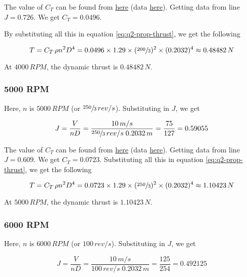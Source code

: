 The value of $C_T$ can be found from \href{https://m-selig.ae.illinois.edu/props/volume-1/plots/apcsf_8x6_ct.png}{here} (data \href{https://m-selig.ae.illinois.edu/props/volume-1/data/apcsf_8x6_2784rd_4010.txt}{here}). Getting data from line $J = 0.726$. We get $C_T = 0.0496$.

By substituting all this in equation \ref{eq:q2-prop-thrust}, we get the following

\begin{equation*}
    T = C_T \, \rho n^2 D^4 = 0.0496 \times 1.29 \times (\sfrac{200}{3})^2 \times (0.2032)^4 \approx 0.48482\,N
\end{equation*}

At $4000\,RPM$, the dynamic thrust is $0.48482\,N$.

\subsubsection*{5000 RPM}

Here, $n$ is $5000\,RPM$ (or $\sfrac{250}{3}\,rev/s$). Substituting in $J$, we get

\begin{equation*}
    J = \frac{V}{nD} = \frac{10\,m/s}{\sfrac{250}{3}\,rev/s \; 0.2032\,m} = \frac{75}{127} = 0.59055
\end{equation*}

The value of $C_T$ can be found from \href{https://m-selig.ae.illinois.edu/props/volume-1/plots/apcsf_8x6_ct.png}{here} (data \href{https://m-selig.ae.illinois.edu/props/volume-1/data/apcsf_8x6_2786rd_5004.txt}{here}). Getting data from line $J=0.609$. We get $C_T = 0.0723$. Substituting all this in equation \ref{eq:q2-prop-thrust}, we get the following

\begin{equation*}
    T = C_T \, \rho n^2 D^4 = 0.0723 \times 1.29 \times (\sfrac{250}{3})^2 \times (0.2032)^4 \approx 1.10423\,N
\end{equation*}

At $5000\,RPM$, the dynamic thrust is $1.10423\,N$.

\subsubsection*{6000 RPM}

Here, $n$ is $6000\,RPM$ (or $100\,rev/s$). Substituting in $J$, we get

\begin{equation*}
    J = \frac{V}{nD} = \frac{10\,m/s}{100\,rev/s \; 0.2032\,m} = \frac{125}{254} = 0.492125
\end{equation*}

